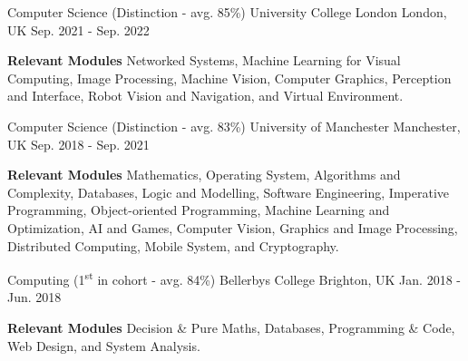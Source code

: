 

\begin{cventries}

  \eduentry
    {Computer Science (Distinction - avg. 85\%)} %
    {University College London} %
    {London, UK} %
    {Sep. 2021 - Sep. 2022} %
    {
      \begin{cvitems} %
        \item {\textbf{Relevant Modules} Networked Systems, Machine Learning for Visual Computing, Image Processing, Machine Vision, Computer Graphics, Perception and Interface, Robot Vision and Navigation, and Virtual Environment.}
      \end{cvitems}
    }
    
  \eduentry
    {Computer Science (Distinction - avg. 83\%)} %
    {University of Manchester} %
    {Manchester, UK} %
    {Sep. 2018 - Sep. 2021} %
    {
      \begin{cvitems} %
        \item {\textbf{Relevant Modules} Mathematics, Operating System, Algorithms and Complexity, Databases, Logic and Modelling, Software Engineering, Imperative Programming, Object-oriented Programming, Machine Learning and Optimization, AI and Games,  Computer Vision, Graphics and Image Processing, Distributed Computing, Mobile System, and Cryptography.}
      \end{cvitems}
    }
    
  \eduentry
    {Computing (1\textsuperscript{st} in cohort - avg. 84\%)} %
    {Bellerbys College} %
    {Brighton, UK} %
    {Jan. 2018 - Jun. 2018} %
    {
     \begin{cvitems} %
        \item {\textbf{Relevant Modules} Decision \& Pure Maths, Databases, Programming \& Code, Web Design, and System Analysis.}
      \end{cvitems}
    }
    

\end{cventries}
